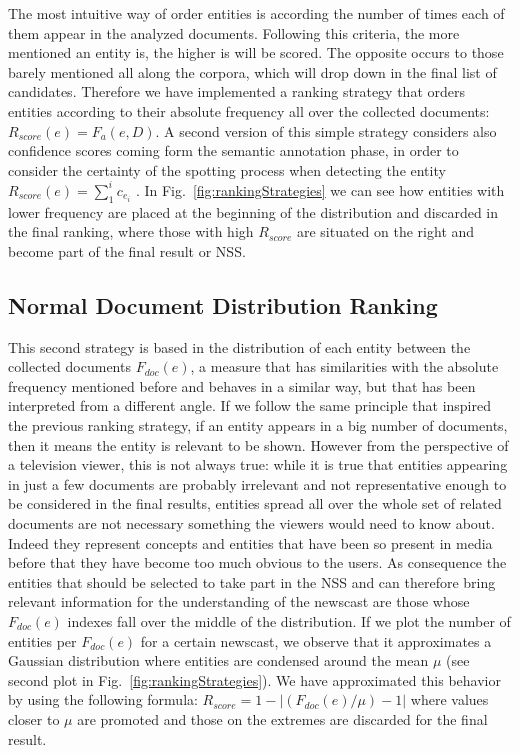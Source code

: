 \documentclass{llncs}
\begin{document}
The most intuitive way of order entities is according the number of times each of them appear in the analyzed documents. Following this criteria, the more mentioned an entity is, the higher is will be scored. The opposite occurs to those barely mentioned all along the corpora, which will drop down in the final list of candidates. Therefore we have implemented a ranking strategy 
that orders entities according to their absolute frequency all over the collected documents: $R_{score}\left ( e \right ) =  F_{a}(e, D)$. 
A second version of this simple strategy considers also confidence scores coming form the semantic annotation phase, in order to consider the certainty of the spotting process when detecting the entity $R_{score}\left ( e \right ) =  \sum_{1}^{i}c_{e_{i}}$ . In Fig.~\ref{fig:rankingStrategies} we can see how entities with lower frequency are placed at the beginning of the distribution and discarded in the final ranking, where those with high $R_{score}$ are situated on the right and become part of the final result or NSS.

\subsection{Normal Document Distribution Ranking}

This second strategy is based in the distribution of each entity between the collected documents $F_{doc}(e)$, a measure that has similarities with the absolute frequency mentioned before and behaves in a similar way, but that has been interpreted from a different angle. If we follow the same principle that inspired the previous ranking strategy, if an entity appears in a big number of documents, then it means the entity is relevant to be shown. However from the perspective of a television viewer, this is not always true: while it is true that entities appearing in just a few documents are probably irrelevant and not representative enough to be considered in the final results, entities spread all over the whole set of related documents are not necessary something the viewers would need to know about. Indeed they represent concepts and entities that have been so present in media before that they have become too much obvious to the users.  As consequence the entities that should be selected to take part in the NSS and can therefore bring relevant information for the understanding of the newscast are those whose $F_{doc}(e)$ indexes fall over the middle of the distribution. If we plot the number of entities per $F_{doc}(e)$ for a certain newscast, we observe that it approximates a Gaussian distribution where entities are condensed around the mean $\mu$ (see second plot in Fig.~\ref{fig:rankingStrategies}). We have approximated this behavior by using the following formula: $R_{score} = 1-\left | (F_{doc}(e)/\mu) -1 \right |$ where values closer to $\mu$ are promoted and those on the extremes are discarded for the final result.
\end{document}

